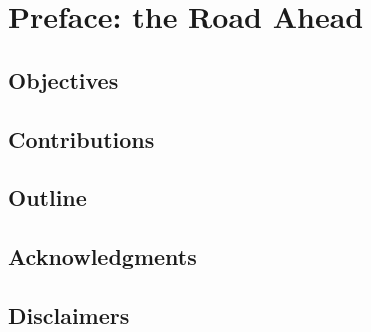 \chapter{Preface: the Road Ahead}
\label{ch:preface}

\section{Objectives}

\section{Contributions}

\section{Outline}

\section{Acknowledgments}

\section{Disclaimers}